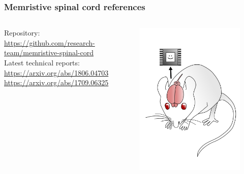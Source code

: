 \documentclass[12pt, aspectratio=169]{beamer}
\begin{document}
\begin{frame}
  \frametitle{Memristive spinal cord references}
\begin{columns}[c]

Repository:\\
\url{https://github.com/research-team/memristive-spinal-cord}\\


Latest technical reports:\\
\url{https://arxiv.org/abs/1806.04703}
\url{https://arxiv.org/abs/1709.06325}

\begin{figure}
\includegraphics[width=1.0\linewidth]{mousebrainpink}
\end{figure}
\end{columns}
\end{frame}
\end{document}
